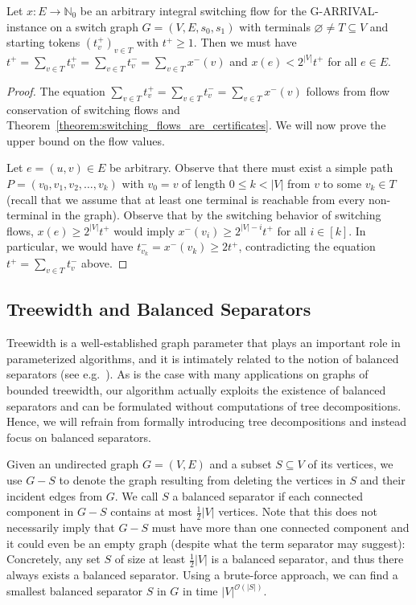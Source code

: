 \documentclass[a4paper,UKenglish,cleveref, autoref, thm-restate]{lipics-v2021}
\newcommand{\N}{\mathbb{N}}
\newcommand{\bigO}{\mathcal{O}}
\let\emptyset\varnothing
\newcommand{\problem}[1]{\textrm{#1}}
\newcommand{\garrival}{\problem{G-ARRIVAL}}
\begin{document}
\begin{lemma}
\label{lemma:upper_bound_flow}
    Let $x : E \rightarrow \N_0$ be an arbitrary integral switching flow for the \garrival-instance on a switch graph $G = (V, E, s_0, s_1)$ with terminals $\emptyset \neq T \subseteq V$ and starting tokens $(t^+_v)_{v \in T}$ with $t^+ \geq 1$. Then we must have $t^+ = \sum_{v \in T} t^+_v = \sum_{v \in T} t^-_v = \sum_{v \in T} x^-(v)$ and $x(e) < 2^{|V|}t^+$ for all $e \in E$.
\end{lemma}
\begin{proof}
    The equation $\sum_{v \in T} t^+_v = \sum_{v \in T} t^-_v = \sum_{v \in T} x^-(v)$ follows from flow conservation of switching flows and Theorem~\ref{theorem:switching_flows_are_certificates}. We will now prove the upper bound on the flow values. 
    
    Let $e = (u, v) \in E$ be arbitrary. Observe that there must exist a simple path $P = (v_0, v_1, v_2, \dots, v_k)$ with $v_0 = v$ of length $0 \leq k < |V|$ from $v$ to some $v_k \in T$ (recall that we assume that at least one terminal is reachable from every non-terminal in the graph). Observe that by the switching behavior of switching flows, $x(e) \geq 2^{|V|}t^+$ would imply $x^-(v_i) \geq 2^{|V| - i}t^+$ for all $i \in [k]$. In particular, we would have $t^-_{v_k} = x^-(v_k) \geq 2 t^+$, contradicting the equation $t^+ = \sum_{v \in T} t^-_v$ above.
\end{proof}

\subsection{Treewidth and Balanced Separators}
\label{ssec:treewidth_separators}

Treewidth is a well-established graph parameter that plays an important role in parameterized algorithms, and it is intimately related to the notion of balanced separators (see e.g.\@~\cite[Chapter~7]{cyganParameterizedAlgorithms2015}). As is the case with many applications on graphs of bounded treewidth, our algorithm actually exploits the existence of balanced separators and can be formulated without computations of tree decompositions. Hence, we will refrain from formally introducing tree decompositions and instead focus on balanced separators. 

Given an undirected graph $G = (V, E)$ and a subset $S \subseteq V$ of its vertices, we use $G - S$ to denote the graph resulting from deleting the vertices in $S$ and their incident edges from $G$. We call $S$ a balanced separator if each connected component in $G - S$ contains at most $\frac{1}{2}|V|$ vertices. Note that this does not necessarily imply that $G - S$ must have more than one connected component and it could even be an empty graph (despite what the term separator may suggest): Concretely, any set $S$ of size at least $\frac{1}{2}|V|$ is a balanced separator, and thus there always exists a balanced separator. Using a brute-force approach, we can find a smallest balanced separator $S$ in $G$ in time $|V|^{\bigO(|S|)}$.
\end{document}
